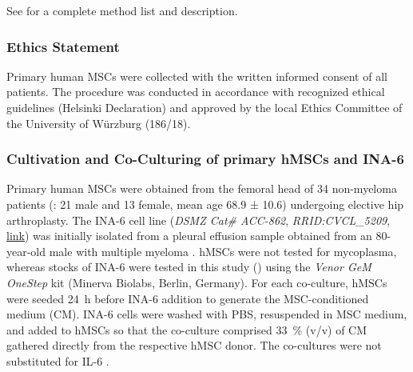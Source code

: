 \newpage



\label{C1:methods}
See  for a complete method list and description.


\subsubsection*{Ethics Statement}
Primary human MSCs were collected with the written informed consent of all
patients. The procedure was conducted in accordance with recognized ethical
guidelines (Helsinki Declaration) and approved by the local Ethics Committee of
the University of Würzburg (186/18).



\subsubsection*{Cultivation and Co-Culturing of primary hMSCs and INA-6}
Primary human MSCs were obtained from the femoral head of 34 non-myeloma
patients (: 21 male and 13 female, mean age
68.9 ± 10.6) undergoing elective hip arthroplasty. The INA-6 cell line
(\textit{DSMZ Cat\# ACC-862}, \textit{RRID:CVCL\_5209},
\href{https://www.cellosaurus.org/CVCL_5209}{link}) was initially isolated from
a pleural effusion sample obtained from an 80-year-old male with multiple
myeloma \cite{burgerGp130RasMediated2001c,gramatzkiTwoNewInterleukin61994}.
hMSCs were not tested for mycoplasma, whereas stocks of INA-6 were tested in
this study () using the \textit{Venor GeM OneStep} kit
(Minerva Biolabs, Berlin, Germany). For each co-culture, hMSCs were seeded
\SI{24}{\hour} before INA-6 addition to generate the MSC-conditioned medium
(CM). INA-6 cells were washed with PBS, resuspended in MSC medium, and added to
hMSCs so that the co-culture comprised \SI{33}{\percent} (v/v) of CM gathered
directly from the respective hMSC donor. The co-cultures were not substituted
for IL-6 \cite{chatterjeePresenceBoneMarrow2002}.




